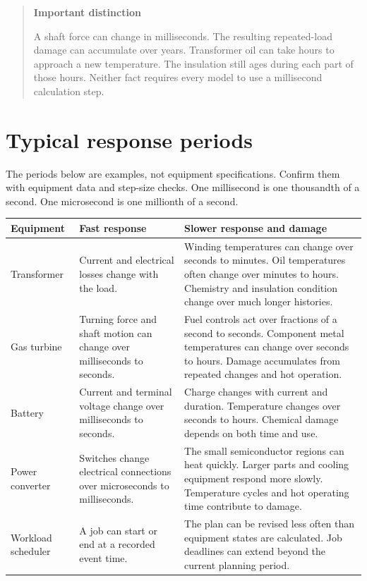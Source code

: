 \documentclass[11pt,a4paper]{report}
\newenvironment{readerbox}[1]{\begin{quote}\color{reportblue}\textbf{#1}\par\normalcolor}{\end{quote}}
\begin{document}
\begin{readerbox}{Important distinction}
A shaft force can change in milliseconds.
The resulting repeated-load damage can accumulate over years.
Transformer oil can take hours to approach a new temperature.
The insulation still ages during each part of those hours.
Neither fact requires every model to use a millisecond calculation step.
\end{readerbox}

\section{Typical response periods}
The periods below are examples, not equipment specifications.
Confirm them with equipment data and step-size checks.
One millisecond is one thousandth of a second.
One microsecond is one millionth of a second.

\begin{longtable}{L{0.20\textwidth}L{0.31\textwidth}L{0.37\textwidth}}
\toprule Equipment & Fast response & Slower response and damage \\ \midrule\endhead
Transformer & Current and electrical losses change with the load. & Winding temperatures can change over seconds to minutes. Oil temperatures often change over minutes to hours. Chemistry and insulation condition change over much longer histories. \\
Gas turbine & Turning force and shaft motion can change over milliseconds to seconds. & Fuel controls act over fractions of a second to seconds. Component metal temperatures can change over seconds to hours. Damage accumulates from repeated changes and hot operation. \\
Battery & Current and terminal voltage change over milliseconds to seconds. & Charge changes with current and duration. Temperature changes over seconds to hours. Chemical damage depends on both time and use. \\
Power converter & Switches change electrical connections over microseconds to milliseconds. & The small semiconductor regions can heat quickly. Larger parts and cooling equipment respond more slowly. Temperature cycles and hot operating time contribute to damage. \\
Workload scheduler & A job can start or end at a recorded event time. & The plan can be revised less often than equipment states are calculated. Job deadlines can extend beyond the current planning period. \\
\bottomrule
\end{longtable}
\end{document}
